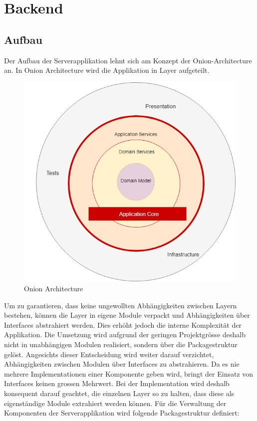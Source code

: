\section{Backend}

\subsection{Aufbau}

Der Aufbau der Serverapplikation lehnt sich am Konzept der Onion-Architecture an.
In Onion Architecture wird die Applikation in Layer aufgeteilt.

\begin{figure}[h]
    \centering
    \begin{minipage}[b]{0.4\textwidth}
        \includegraphics[width=\textwidth]{images/thinktocode-onion}
        \caption{Onion Architecture}
    \end{minipage}\label{fig:figureonion}
\end{figure}

Um zu garantieren, dass keine ungewollten Abhängigkeiten zwischen Layern bestehen, können die Layer in eigene Module verpackt und Abhängigkeiten über Interfaces abstrahiert werden.
Dies erhöht jedoch die interne Komplexität der Applikation.
Die Umsetzung wird aufgrund der geringen Projektgrösse deshalb nicht in unabhängigen Modulen realisiert, sondern über die Packagestruktur gelöst.
Angesichts dieser Entscheidung wird weiter darauf verzichtet, Abhängigkeiten zwischen Modulen über Interfaces zu abstrahieren.
Da es nie mehrere Implementationen einer Komponente geben wird, bringt der Einsatz von Interfaces keinen grossen Mehrwert.
Bei der Implementation wird deshalb konsequent darauf geachtet, die einzelnen Layer so zu halten, dass diese als eigenständige Module extrahiert werden können.
Für die Verwaltung der Komponenten der Serverapplikation wird folgende Packagestruktur definiert:

